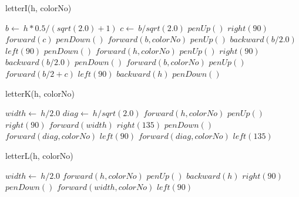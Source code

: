 \documentclass[a4paper,10pt]{article}
\begin{document}
\begin{algorithm}
\caption{letterI(h, colorNo)}
\begin{algorithmic}[5]

\STATE {}
\STATE {}
  \STATE \(b\gets\ h*0.5/(sqrt(2.0)+1)\)
  \STATE \(c\gets\ b/sqrt(2.0)\)
  \STATE \(penUp()\)
  \STATE \(right(90)\)
  \STATE \(forward(c)\)
  \STATE \(penDown()\)
  \STATE \(forward(b,colorNo)\)
  \STATE \(penUp()\)
  \STATE \(backward(b/2.0)\)
  \STATE \(left(90)\)
  \STATE \(penDown()\)
  \STATE \(forward(h,colorNo)\)
  \STATE \(penUp()\)
  \STATE \(right(90)\)
  \STATE \(backward(b/2.0)\)
  \STATE \(penDown()\)
  \STATE \(forward(b,colorNo)\)
  \STATE \(penUp()\)
  \STATE \(forward(b/2+c)\)
  \STATE \(left(90)\)
  \STATE \(backward(h)\)
  \STATE \(penDown()\)

\end{algorithmic}
\end{algorithm}


\begin{algorithm}
\caption{letterK(h, colorNo)}
\begin{algorithmic}[5]

\STATE {}
\STATE {}
  \STATE \(width\gets\ h/2.0\)
  \STATE \(diag\gets\ h/sqrt(2.0)\)
  \STATE \(forward(h,colorNo)\)
  \STATE \(penUp()\)
  \STATE \(right(90)\)
  \STATE \(forward(width)\)
  \STATE \(right(135)\)
  \STATE \(penDown()\)
  \STATE \(forward(diag,colorNo)\)
  \STATE \(left(90)\)
  \STATE \(forward(diag,colorNo)\)
  \STATE \(left(135)\)

\end{algorithmic}
\end{algorithm}


\begin{algorithm}
\caption{letterL(h, colorNo)}
\begin{algorithmic}[5]

\STATE {}
\STATE {}
  \STATE \(width\gets\ h/2.0\)
  \STATE \(forward(h,colorNo)\)
  \STATE \(penUp()\)
  \STATE \(backward(h)\)
  \STATE \(right(90)\)
  \STATE \(penDown()\)
  \STATE \(forward(width,colorNo)\)
  \STATE \(left(90)\)

\end{algorithmic}
\end{algorithm}
\end{document}
